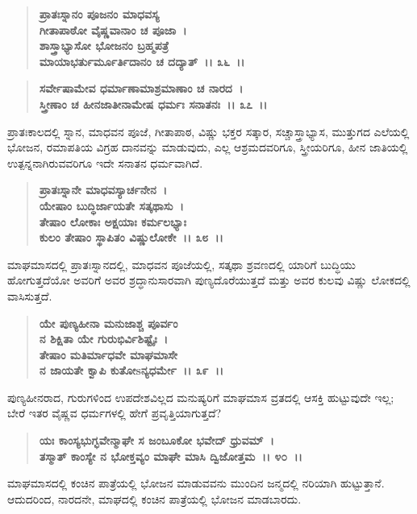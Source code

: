 \begin{verse}
\textbf{ಪ್ರಾತಃಸ್ನಾನಂ ಪೂಜನಂ ಮಾಧವಸ್ಯ}\\\textbf{ಗೀತಾಪಾಠೋ ವೈಷ್ಣವಾನಾಂ ಚ ಪೂಜಾ~। }\\\textbf{ಶಾಸ್ತ್ರಾಭ್ಯಾಸೋ ಭೋಜನಂ ಬ್ರಹ್ಮಪತ್ರೆ} \\\textbf{ಮಾಯಾಭರ್ತುರ್ಮೂರ್ತಿದಾನಂ ಚ ದದ್ಯಾತ್~।। ೩೬~।। }
\end{verse}

\begin{verse}
\textbf{ಸರ್ವೇಷಾಮೇವ ಧರ್ಮಾಣಾಮಾಶ್ರಮಾಣಾಂ ಚ ನಾರದ~।}\\\textbf{ಸ್ತ್ರೀಣಾಂ ಚ ಹೀನಜಾತೀನಾಮೇಷ ಧರ್ಮಃ ಸನಾತನಃ~।। ೩೭~।।}
\end{verse}

ಪ್ರಾತಃಕಾಲದಲ್ಲಿ ಸ್ನಾನ, ಮಾಧವನ ಪೂಜೆ, ಗೀತಾಪಾಠ, ವಿಷ್ಣು ಭಕ್ತರ ಸತ್ಕಾರ, ಸಚ್ಚಾಸ್ತ್ರಾಭ್ಯಾಸ, ಮುತ್ತುಗದ ಎಲೆಯಲ್ಲಿ ಭೋಜನ, ರಮಾಪತಿಯ ವಿಗ್ರಹ ದಾನವನ್ನು ಮಾಡುವುದು, ಎಲ್ಲ ಆಶ್ರಮದವರಿಗೂ, ಸ್ತ್ರೀಯರಿಗೂ, ಹೀನ ಜಾತಿಯಲ್ಲಿ ಉತ್ಪನ್ನನಾಗಿರುವವರಿಗೂ ಇದೇ ಸನಾತನ ಧರ್ಮವಾಗಿದೆ.

\begin{verse}
\textbf{ಪ್ರಾತಃಸ್ನಾನೇ ಮಾಧವಸ್ಯಾರ್ಚನೇನ~।}\\\textbf{ಯೇಷಾಂ ಬುದ್ಧಿರ್ಜಾಯತೇ ಸತ್ಕಥಾಸು~। }\\\textbf{ತೇಷಾಂ ಲೋಕಾಃ ಅಕ್ಷಯಾಃ ಕರ್ಮಲಭ್ಯಾಃ} \\\textbf{ಕುಲಂ ತೇಷಾಂ ಸ್ಥಾಪಿತಂ ವಿಷ್ಣುಲೋಕೇ~।। ೩೮~।।}
\end{verse}

ಮಾಘಮಾಸದಲ್ಲಿ ಪ್ರಾತಃಸ್ನಾನದಲ್ಲಿ, ಮಾಧವನ ಪೂಜೆಯಲ್ಲಿ, ಸತ್ಕಥಾ ಶ್ರವಣದಲ್ಲಿ ಯಾರಿಗೆ ಬುದ್ಧಿಯು ಹೋಗುತ್ತದೆಯೋ ಅವರಿಗೆ ಅವರ ಶ್ರದ್ಧಾನುಸಾರವಾಗಿ ಪುಣ್ಯ\break ದೊರೆಯುತ್ತದೆ ಮತ್ತು ಅವರ ಕುಲವು ವಿಷ್ಣು ಲೋಕದಲ್ಲಿ ವಾಸಿಸುತ್ತದೆ.

\begin{verse}
\textbf{ಯೇ ಪುಣ್ಯಹೀನಾ ಮನುಜಾಶ್ಚ ಪೂರ್ವಂ}\\\textbf{ನ ಶಿಕ್ಷಿತಾ ಯೇ ಗುರುಭಿರ್ವಿಶಿಷ್ಟೈಃ~। }\\\textbf{ತೇಷಾಂ ಮತಿರ್ಮಾಧವೇ ಮಾಘಮಾಸೇ} \\\textbf{ನ ಜಾಯತೇ ಕ್ವಾಪಿ ಕುತೋsನ್ಯಧರ್ಮೇ~।। ೩೯~।।}
\end{verse}

ಪುಣ್ಯಹೀನರಾದ, ಗುರುಗಳಿಂದ ಉಪದೇಶವಿಲ್ಲದ ಮನುಷ್ಯರಿಗೆ ಮಾಘಮಾಸ ವ್ರತದಲ್ಲಿ ಆಸಕ್ತಿ ಹುಟ್ಟುವುದೇ ಇಲ್ಲ; ಬೇರೆ ಇತರ ವೈಷ್ಣವ ಧರ್ಮಗಳಲ್ಲಿ ಹೇಗೆ ಪ್ರವೃತ್ತಿಯಾಗುತ್ತದೆ?

\begin{verse}
\textbf{ಯಃ ಕಾಂಸ್ಯಭುಗ್ಭವೇನ್ಮಾಘೇ ಸ ಜಂಬೂಕೋ ಭವೇದ್ ಧ್ರುವಮ್~।}\\\textbf{ತಸ್ಮಾತ್ ಕಾಂಸ್ಯೇ ನ ಭೋಕ್ತವ್ಯಂ ಮಾಘೇ ಮಾಸಿ ದ್ವಿಜೋತ್ತಮ~।। ೪೦~।।}
\end{verse}

ಮಾಘಮಾಸದಲ್ಲಿ ಕಂಚಿನ ಪಾತ್ರೆಯಲ್ಲಿ ಭೋಜನ ಮಾಡುವವನು ಮುಂದಿನ ಜನ್ಮದಲ್ಲಿ ನರಿಯಾಗಿ ಹುಟ್ಟುತ್ತಾನೆ. ಆದುದರಿಂದ, ನಾರದನೇ, ಮಾಘದಲ್ಲಿ ಕಂಚಿನ ಪಾತ್ರೆಯಲ್ಲಿ ಭೋಜನ ಮಾಡಬಾರದು.

